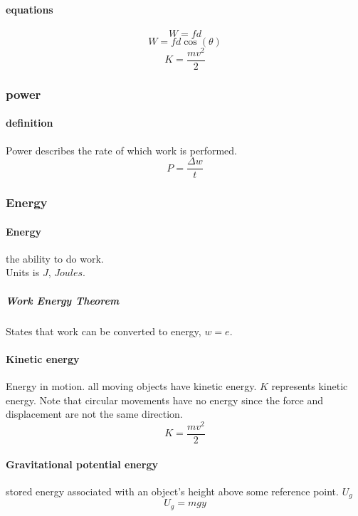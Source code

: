 \documentclass{article} %
\theoremstyle{theorem}
\theoremstyle{definition}
\begin{document}
            \paragraph{equations}
                \begin{equation} W=fd \end{equation}
                \begin{equation} W=fd\cos(\theta) \end{equation}
                \begin{equation} K=\frac{mv^2}{2} \end{equation}
        \subsubsection{power}
            \paragraph{definition}
                Power describes the rate of which work is performed.
                \begin{equation} P=\dfrac{\Delta w}{t} \end{equation}
        \subsubsection{Energy}
            \paragraph{Energy}
                the ability to do work.\\ Units is $J$, $Joules$.
                \subparagraph{Work Energy Theorem}
                    States that work can be converted to energy, $w=e$.
            \paragraph{Kinetic energy}
                Energy in motion. all moving objects have kinetic energy. $K$ represents kinetic energy.
                Note that circular movements have no energy since the force and displacement are not the same direction.
                $$K=\frac{mv^2}{2}$$ 
            \paragraph{Gravitational potential energy}%
            \label{par:Gravitational potential energy}
                stored energy associated with an object's height above some reference point. $U_g$
                \begin{equation}
                    U_g=mgy
                \end{equation}
\end{document}
